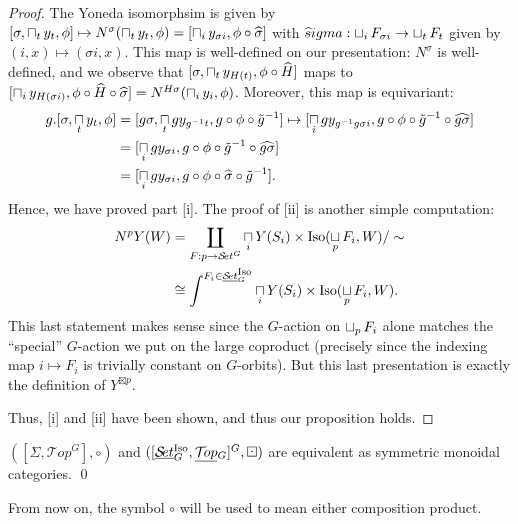 \documentclass{report}
\newcommand{\Top}{\text{$\mathcal{T}\!op$}}
\newcommand{\Set}{\text{$\mathcal{S}\!et$}}
\DeclareMathOperator{\Iso}{Iso}
\newcommand{\TopG}{\text{\underline{$\Top$}$_G$}}
\newcommand{\SetG}{\text{\underline{$\Set$}$_G^{\mbox{\scriptsize Iso}}$}}
\renewcommand{\ST}{\text{$[\SetG,\TopG]^G$}}
\newcommand{\icap}{\operatornamewithlimits{\sqcap}}
\newcommand{\ico}{\operatornamewithlimits{\sqcup}}
\renewcommand{\hat}[1]{\text{$\widehat{#1}$}}
\begin{document}
\begin{proof}
  The Yoneda isomorphsim is given by $[\sigma,\icap_ty_t,\phi]\mapsto N^\sigma(\icap_ty_t,\phi) = [\icap_iy_{\sigma i},\phi\circ \hat \sigma]$ with $\hat sigma: \ico_iF_{\sigma i}\to \ico_tF_t$ given by $(i,x)\mapsto (\sigma i, x)$. This map is well-defined on our presentation: $N^\sigma$ is well-defined, and we observe that $[\sigma,\icap_ty_{H(t)},\phi\circ \hat H]$ maps to $[\icap_iy_{H(\sigma i)},\phi \circ \hat H \circ \hat \sigma] = N^{H\sigma}(\icap_iy_i,\phi)$. Moreover, this map is equivariant:
  \begin{align*}
    g.[\sigma,\icap_ty_t,\phi] &= [g\sigma,\icap_tgy_{g^{-1}t},g\circ\phi\circ\tilde g^{-1}] \mapsto [\icap_igy_{g^{-1}g\sigma i},g\circ\phi\circ \tilde g^{-1}\circ \hat{g\sigma}]\\
    &= [\icap_igy_{\sigma i},g\circ\phi\circ\tilde g^{-1}\circ\hat{g\sigma}]\\
    &= [\icap_igy_{\sigma i},g\circ\phi\circ\hat\sigma\circ\tilde g^{-1}].
  \end{align*}
  Hence, we have proved part [i]. The proof of [ii] is another simple computation:
  \begin{align*}
    N^pY(W) &= \coprod_{F: p\to \Set^G}\icap_iY(S_i) \times \Iso(\ico_pF_i,W)/\sim\\
    &\cong \int^{F_i\in \SetG}\icap_iY(S_i)\times \Iso(\ico_pF_i,W).
  \end{align*}
  This last statement makes sense since the $G$-action on $\ico_pF_i$ alone matches the ``special'' $G$-action we put on the large coproduct (precisely since the indexing map $i\mapsto F_i$ is trivially constant on $G$-orbits). But this last presentation is exactly the definition of $Y^{\boxtimes p}$. 

  Thus, [i] and [ii] have been shown, and thus our proposition holds.
\end{proof}

\begin{theorem}
  $([\Sigma,\Top^G],\circ)$ and $(\ST,\boxdot)$ are equivalent as symmetric monoidal categories. \qed
\end{theorem}

\begin{remark}
  From now on, the symbol $\circ$ will be used to mean either composition product. 
\end{remark}
\end{document}
